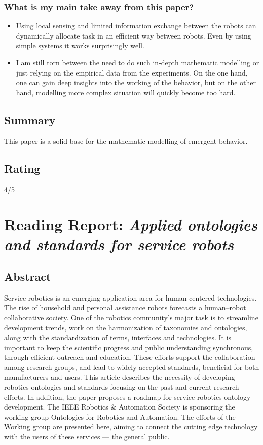     \subsubsection*{What is my main take away from this paper?}
    \begin{itemize}
        \item Using local sensing and limited  information exchange between the robots can dynamically allocate task in an efficient way between robots. Even by using simple systems it works surprisingly well.
        \item I am still torn between the need to do such in-depth mathematic modelling or just relying on the empirical data from the experiments. On the one hand, one can gain deep insights into the working of the behavior, but on the other hand, modelling more complex situation will quickly become too hard.
    \end{itemize}
    
    \subsection*{Summary}
    This paper is a solid base for the mathematic modelling of emergent behavior.  
    \subsection*{Rating}
    4/5

    \newpage
    
    \section{Reading Report: \emph{Applied ontologies and standards for service robots}}
    \cite{Haidegger2013}
    
    \subsection*{Abstract}
    Service robotics is an emerging application area for human-centered technologies. The rise of household
    and personal assistance robots forecasts a human–robot collaborative society. One of the robotics community’s major task is to streamline development trends, work on the harmonization of taxonomies and
    ontologies, along with the standardization of terms, interfaces and technologies. It is important to keep
    the scientific progress and public understanding synchronous, through efficient outreach and education.
    These efforts support the collaboration among research groups, and lead to widely accepted standards,
    beneficial for both manufacturers and users. This article describes the necessity of developing robotics ontologies and standards focusing on the past and current research efforts. In addition, the paper proposes a
    roadmap for service robotics ontology development. The IEEE Robotics \& Automation Society is sponsoring
    the working group Ontologies for Robotics and Automation. The efforts of the Working group are presented
    here, aiming to connect the cutting edge technology with the users of these services — the general public.
    
